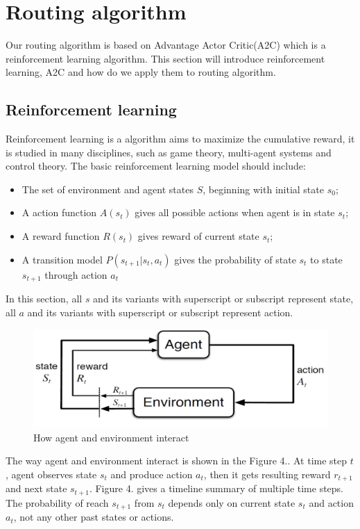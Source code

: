 \section{Routing algorithm}
Our routing algorithm is based on Advantage Actor Critic(A2C) which is a reinforcement learning algorithm. This section will introduce reinforcement learning, A2C and how do we apply them to routing algorithm.

\subsection{Reinforcement learning}
Reinforcement learning is a algorithm aims to maximize the cumulative reward, it is studied in many disciplines, such as game theory, multi-agent systems and control theory. The basic reinforcement learning model should include:
\begin{itemize}
    \item The set of environment and agent states $S$, beginning with initial state $s_0$;
    \item A action function $A(s_t)$ gives all possible actions when agent is in state $s_t$;
    \item A reward function $R(s_t)$ gives reward of current state $s_t$;
    \item A transition model $P(s_{t+1}|s_t,a_t)$ gives the probability of state $s_t$ to state $s_{t+1}$ through action $a_t$
\end{itemize}
In this section, all $s$ and its variants with superscript or subscript represent state, all $a$ and its variants with superscript or subscript represent action. 

\begin{figure}[h]
    \centering
    \includegraphics[width=\linewidth]{../Figures/agent_env.JPG}
    \caption{How agent and environment interact}
\end{figure}

The way agent and environment interact is shown in the Figure 4.. At time step $t$, agent observes state $s_t$ and produce action $a_t$, then it gets resulting reward $r_{t+1}$ and next state $s_{t+1}$. Figure 4. gives a timeline summary of 
multiple time steps. The probability of reach $s_{t+1}$ from $s_t$ depends only on current state $s_t$ and action $a_t$, not any other past states or actions.

